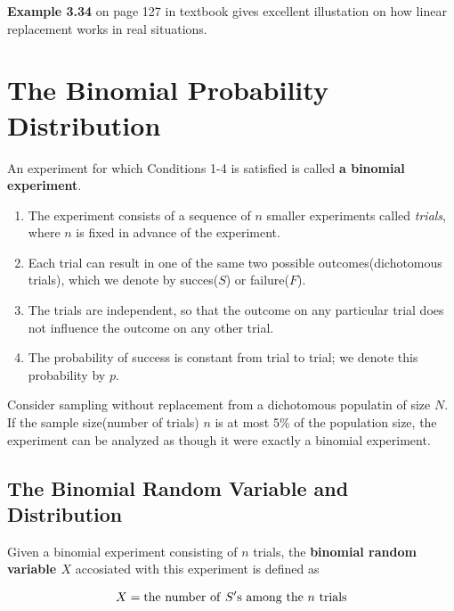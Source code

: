 \textbf{Example 3.34} on page 127 in textbook gives excellent illustation on how linear replacement works in real situations.

\section{The Binomial Probability Distribution}

\begin{definition}
    An experiment for which Conditions 1-4 is satisfied is called \textbf{a binomial experiment}.

    \begin{enumerate}
        \item The experiment consists of a sequence of $n$ smaller experiments called \textit{trials}, where $n$ is fixed in advance of the experiment.
        \item Each trial can result in one of the same two possible outcomes(dichotomous trials), which we denote by succes($S$) or failure($F$).
        \item The trials are independent, so that the outcome on any particular trial does not influence the outcome on any other trial.
        \item The probability of success is constant from trial to trial; we denote this probability by $p$.
    \end{enumerate}
\end{definition}

\begin{proposition}
    Consider sampling without replacement from a dichotomous populatin of size $N$. If the sample size(number of trials) $n$ is at most 5\% of the population size, the experiment can be analyzed as though it were exactly a binomial experiment.
\end{proposition}

\subsection{The Binomial Random Variable and Distribution}

\begin{definition}
    Given a binomial experiment consisting of $n$ trials, the \textbf{binomial random variable $X$} accosiated with this experiment is defined as 

    \begin{align*}
        X = {\rm the\ number\ of\ } S{\rm 's\ among\ the\ }n{\rm\ trials} \\
    \end{align*}
\end{definition}

